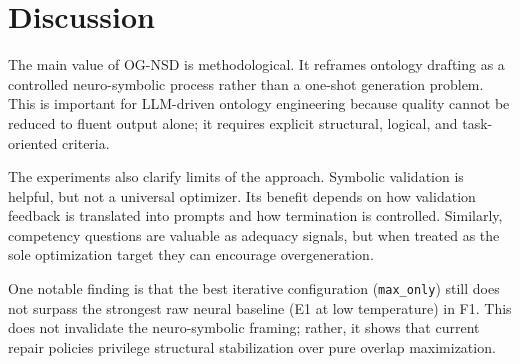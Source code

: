 \section{Discussion}

The main value of OG-NSD is methodological. It reframes ontology drafting as a controlled neuro-symbolic process rather than a one-shot generation problem. This is important for LLM-driven ontology engineering because quality cannot be reduced to fluent output alone; it requires explicit structural, logical, and task-oriented criteria.

The experiments also clarify limits of the approach. Symbolic validation is helpful, but not a universal optimizer. Its benefit depends on how validation feedback is translated into prompts and how termination is controlled. Similarly, competency questions are valuable as adequacy signals, but when treated as the sole optimization target they can encourage overgeneration.

One notable finding is that the best iterative configuration (\texttt{max\_only}) still does not surpass the strongest raw neural baseline (E1 at low temperature) in F1. This does not invalidate the neuro-symbolic framing; rather, it shows that current repair policies privilege structural stabilization over pure overlap maximization.
